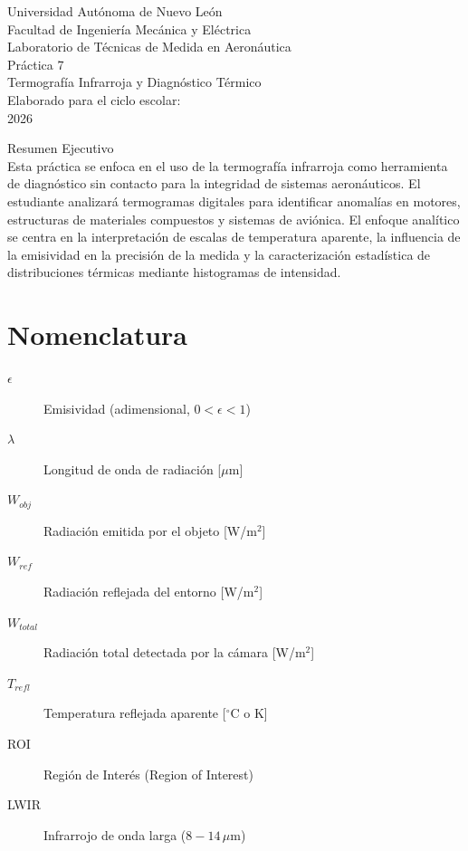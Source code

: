 \documentclass[11pt, a4paper]{article}
\begin{document}
\begin{titlepage}
    \centering
    {\LARGE Universidad Autónoma de Nuevo León}\\[0.5cm]
    {\Large Facultad de Ingeniería Mecánica y Eléctrica}\\[2cm]
    
    {\Large Laboratorio de Técnicas de Medida en Aeronáutica}\\[1cm]
    
    {\Huge Práctica 7}\\[0.5cm]
    {\Large Termografía Infrarroja y Diagnóstico Térmico}\\[2cm]
    
    Elaborado para el ciclo escolar:\\
    2026\\[2cm]
    
    \vfill
    
    Resumen Ejecutivo\\
    Esta práctica se enfoca en el uso de la termografía infrarroja como herramienta de diagnóstico sin contacto para la integridad de sistemas aeronáuticos. El estudiante analizará termogramas digitales para identificar anomalías en motores, estructuras de materiales compuestos y sistemas de aviónica. El enfoque analítico se centra en la interpretación de escalas de temperatura aparente, la influencia de la emisividad en la precisión de la medida y la caracterización estadística de distribuciones térmicas mediante histogramas de intensidad.
\end{titlepage}

\tableofcontents
\newpage

\section*{Nomenclatura}
\begin{description}
    \item[$\epsilon$] Emisividad (adimensional, $0 < \epsilon < 1$)
    \item[$\lambda$] Longitud de onda de radiación [$\mu$m]
    \item[$W_{obj}$] Radiación emitida por el objeto [W/m$^2$]
    \item[$W_{ref}$] Radiación reflejada del entorno [W/m$^2$]
    \item[$W_{total}$] Radiación total detectada por la cámara [W/m$^2$]
    \item[$T_{refl}$] Temperatura reflejada aparente [$^\circ$C o K]
    \item[ROI] Región de Interés (Region of Interest)
    \item[LWIR] Infrarrojo de onda larga ($8 - 14\,\mu$m)
\end{description}
\end{document}
